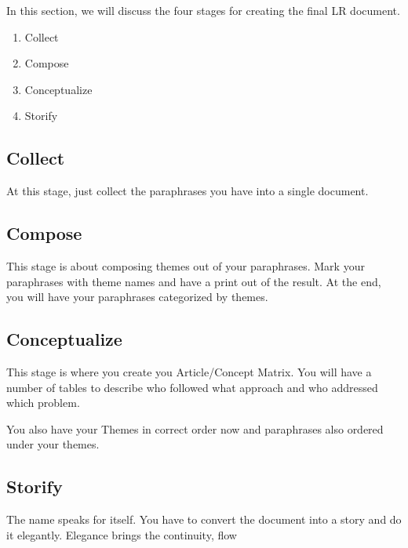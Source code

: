 \documentclass{article}
\begin{document}
In this section, we will discuss the four stages for creating the final LR document. 

\begin{enumerate}
    \item Collect
    \item Compose
    \item Conceptualize
    \item Storify
\end{enumerate}

\subsection{Collect}

At this stage, just collect the paraphrases you have into a single document.

\subsection{Compose}

This stage is about composing themes out of your paraphrases. Mark your paraphrases with theme names and have a print out of the result. At the end, you will have your paraphrases categorized by themes.

\subsection{Conceptualize}

This stage is where you create you Article/Concept Matrix. You will have a number of tables to describe who followed what approach and who addressed which problem.

You also have your Themes in correct order now and paraphrases also ordered under your themes.

\subsection{Storify}

The name speaks for itself. You have to convert the document into a story and do it elegantly. Elegance brings the continuity, flow 
\end{document}
